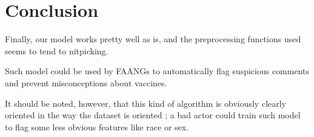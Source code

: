 \documentclass[11pt]{article}
\begin{document}
\section{Conclusion}

Finally, our model works pretty well as is, and the preprocessing functions used seems to tend to nitpicking.

Such model could be used by FAANGs to automatically flag suspicious comments and prevent misconceptions about vaccines.

It should be noted, however, that this kind of algorithm is obviously clearly oriented in the way the dataset is oriented ;
a bad actor could train such model to flag some less obvious features like race or sex.



\end{document}
